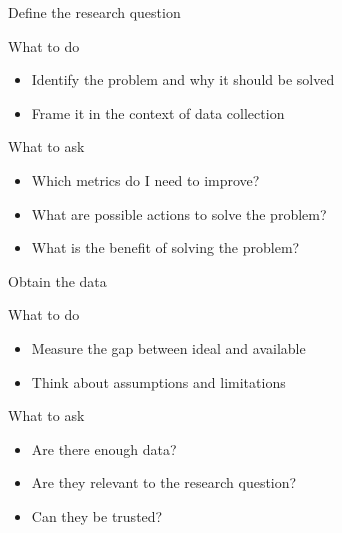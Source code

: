 \begin{frame}[t]{Define the research question}
    \begin{block}{What to do}
        \begin{itemize}
            \item Identify the problem and why it should be solved
            \item Frame it in the context of data collection
        \end{itemize}
    \end{block}
    \vfill\pause
    \begin{block}{What to ask}
        \begin{itemize}
            \item Which metrics do I need to improve?
            \item What are possible actions to solve the problem?
            \item What is the benefit of solving the problem?
        \end{itemize}
    \end{block}
\end{frame}

\begin{frame}[t]{Obtain the data}
    \begin{block}{What to do}
        \begin{itemize}
            \item Measure the gap between ideal and available
            \item Think about assumptions and limitations
        \end{itemize}
    \end{block}
    \vfill\pause
    \begin{block}{What to ask}
        \begin{itemize}
            \item Are there enough data?
            \item Are they relevant to the research question?
            \item Can they be trusted?
        \end{itemize}
    \end{block}
\end{frame}


